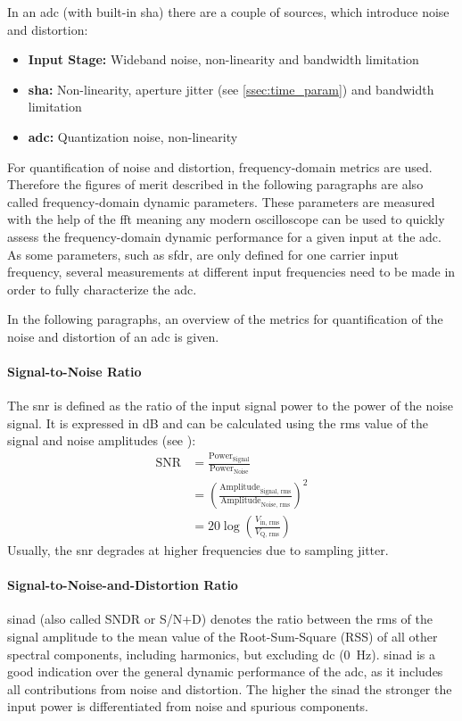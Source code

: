 In an \gls{adc} (with built-in \gls{sha}) there are a couple of sources, which introduce noise and distortion:
\begin{itemize}
	\item \textbf{Input Stage:} Wideband noise, non-linearity and bandwidth limitation
	\item \textbf{\gls{sha}:} Non-linearity, aperture jitter (see \autoref{ssec:time_param}) and bandwidth limitation 
	\item \textbf{\gls{adc}:} Quantization noise, non-linearity
\end{itemize}

For quantification of noise and distortion, frequency-domain metrics are used. 
Therefore the figures of merit described in the following paragraphs are also called frequency-domain dynamic parameters. 
These parameters are measured with the help of the \gls{fft} meaning any modern oscilloscope can be used to quickly assess the frequency-domain dynamic performance for a given input at the \gls{adc}.
As some parameters, such as \gls{sfdr}, are only defined for one carrier input frequency, several measurements at different input frequencies need to be made in order to fully characterize the \gls{adc}.

In the following paragraphs, an overview of the metrics for quantification of the noise and distortion of an \gls{adc} is given. 


\paragraph{Signal-to-Noise Ratio}
The \gls{snr} is defined as the ratio of the input signal power to the power of the noise signal. 
It is expressed in dB and can be calculated using the \gls{rms} value of the signal and noise amplitudes (see \cite{xilinx_adc}):
\begin{align}
	\text{SNR} &= \frac{\text{Power}_\text{Signal}}{\text{Power}_\text{Noise}}\\
	&= \left( \frac{\text{Amplitude}_\text{Signal, rms}}{\text{Amplitude}_\text{Noise, rms}} \right)^2\\
	&= 20 \log \left( \frac{V_\text{in, rms}}{V_\text{Q, rms}}\right) 
\end{align}
Usually, the \gls{snr} degrades at higher frequencies due to sampling jitter. \cite{xilinx_adc}

\paragraph{Signal-to-Noise-and-Distortion Ratio}
\gls{sinad} (also called SNDR or S/N+D) denotes the ratio between the \gls{rms} of the signal amplitude to the mean value of the Root-Sum-Square (RSS) of all other spectral components, including harmonics, but excluding \gls{dc} (\SI{0}{\hertz}). 
\gls{sinad} is a good indication over the general dynamic performance of the \gls{adc}, as it includes all contributions from noise and distortion.
The higher the \gls{sinad} the stronger the input power is differentiated from noise and spurious components. 


